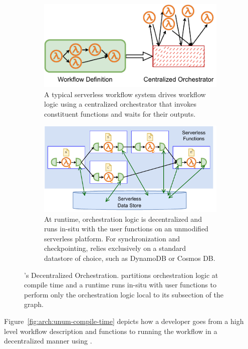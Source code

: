 \begin{figure}[t!]
\begin{subfigure}[t]{0.8\textwidth}
	\end{subfigure}
	\begin{subfigure}[b]{\columnwidth}
		\centering
		\includegraphics[width=0.8\columnwidth]{figures/unum-arch-centralized.pdf}
		\caption{A typical serverless workflow system drives workflow logic
			using a centralized orchestrator that invokes constituent
			functions and waits for their outputs.}
		\label{fig:arch:centralized}
	\end{subfigure}
	\hfill
	\begin{subfigure}[b]{\columnwidth}
		\centering
		\includegraphics[width=.7\columnwidth]{figures/unum-arch-runtime.pdf}
		\caption{At runtime, \name{} orchestration logic is decentralized and
			runs in-situ with the user functions on an unmodified serverless
			platform. For synchronization and checkpointing,
			\name{} relies exclusively on a standard datastore of choice, such
			as DynamoDB or Cosmos DB.}
		\label{fig:arch:unum-runtime}
	\end{subfigure}
	\caption{\name{}'s Decentralized Orchestration. \name{} partitions
	orchestration logic at compile time and a \name{} runtime runs in-situ
	with user functions to perform only the orchestration logic local to its
	subsection of the graph.}
	\label{fig:arch}
\end{figure}

Figure~\ref{fig:arch:unum-compile-time} depicts how a developer goes from a high
level workflow description and functions to running the workflow in a
decentralized manner using \name{}.

